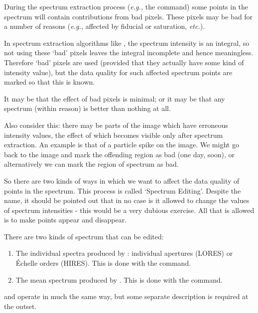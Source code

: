During the spectrum extraction process ({\it{e.g.,}} the
 command)
some points in the spectrum will contain contributions from bad pixels.  These
pixels may be bad for a number of reasons ({\it{e.g.,}} affected by fiducial or
saturation, {\it etc.})\@.

In spectrum extraction algorithms like , the
spectrum intensity is
an integral, so not using these `bad' pixels leaves the integral incomplete and
hence meaningless.  Therefore `bad' pixels are used (provided that they
actually have some kind of intensity value), but the data quality for such
affected spectrum points are marked so that this is known.

It may be that the effect of bad pixels is minimal; or it may be that any
spectrum (within reason) is better than nothing at all.

Also consider this: there may be parts of the image which have erroneous
intensity values, the effect of which becomes visible only after spectrum
extraction.  An example is that of a particle spike on the image.  We
might go back to the image and mark the offending region as bad (one day,
soon), or alternatively we can mark the region of spectrum as bad.

So there are two kinds of ways in which we want to affect the data quality
of points in the spectrum.  This process is called `Spectrum Editing'\@.
Despite the name, it should be pointed out that in no case is it allowed to
change the values of spectrum intensities - this would be a very dubious
exercise.  All that is allowed is to make points appear and disappear.

There are two kinds of spectrum that can be edited:

\begin{enumerate}

\item The individual spectra produced by :
      individual apertures
      (LORES) or \'{E}chelle orders (HIRES)\@.  This is done with the
       command.


\item The mean spectrum produced by \@.
      This is done with the  command.

\end{enumerate}

 and 
operate in much the same way, but some separate description is required at
the outset.


